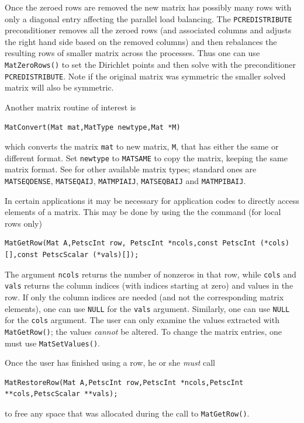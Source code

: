 Once the zeroed rows are removed the new matrix has possibly many rows
with only a diagonal entry affecting the parallel load balancing. The
\lstinline{PCREDISTRIBUTE} preconditioner removes all the zeroed rows (and
associated columns and adjusts the right hand side based on the
removed columns) and then rebalances the resulting rows of smaller
matrix across the processes. Thus one can use \lstinline{MatZeroRows()} to set the Dirichlet points and then solve with the preconditioner \lstinline{PCREDISTRIBUTE}. Note if the original matrix was symmetric the
smaller solved matrix will also be symmetric.

Another matrix routine of interest is
\begin{lstlisting}
MatConvert(Mat mat,MatType newtype,Mat *M)
\end{lstlisting}
which converts the matrix \lstinline{mat} to new matrix, \lstinline{M}, that has
either the same or different format.  Set \lstinline{newtype} to \lstinline{MATSAME}
to copy the matrix, keeping the same matrix format.  See
\href{http://www.mcs.anl.gov/petsc/petsc-current/include/petscmat.h.html}{} for other available matrix types;
standard ones are \lstinline{MATSEQDENSE}, \lstinline{MATSEQAIJ}, \lstinline{MATMPIAIJ},
               \lstinline{MATSEQBAIJ} and \lstinline{MATMPIBAIJ}.

In certain applications it may be necessary for application codes
to directly access elements of a matrix. This may be done by using the
the command (for local rows only)
\begin{lstlisting}
MatGetRow(Mat A,PetscInt row, PetscInt *ncols,const PetscInt (*cols)[],const PetscScalar (*vals)[]);
\end{lstlisting}
The argument \lstinline{ncols} returns the number of nonzeros in that row,
while \lstinline{cols} and \lstinline{vals} returns the column indices (with indices
starting at zero) and values in the row. If only the column
indices are needed (and not the corresponding matrix elements), one
can use \lstinline{NULL} for the \lstinline{vals} argument. Similarly,
one can use \lstinline{NULL} for the \lstinline{cols} argument.
The user can only examine the values extracted with \lstinline{MatGetRow()};
the values {\em cannot} be altered.
To change the matrix entries, one must use \lstinline{MatSetValues()}.

Once the user has finished using a row, he or she {\em must} call
\begin{lstlisting}
MatRestoreRow(Mat A,PetscInt row,PetscInt *ncols,PetscInt **cols,PetscScalar **vals);
\end{lstlisting}
to free any space that was allocated during the call to \lstinline{MatGetRow()}.

